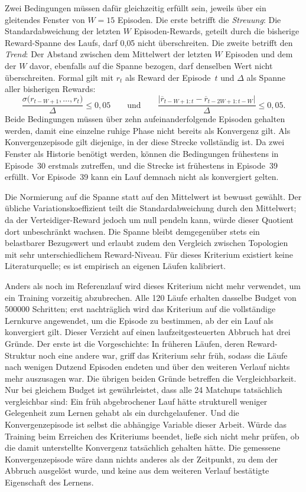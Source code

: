 Zwei Bedingungen müssen dafür gleichzeitig erfüllt sein, jeweils über ein
gleitendes Fenster von $W = 15$ Episoden. Die erste betrifft die
\emph{Streuung}: Die Standardabweichung der letzten $W$ Episoden-Rewards,
geteilt durch die bisherige Reward-Spanne des Laufs, darf 0{,}05 nicht
überschreiten. Die zweite betrifft den \emph{Trend}: Der Abstand zwischen dem
Mittelwert der letzten $W$ Episoden und dem der $W$ davor, ebenfalls auf die
Spanne bezogen, darf denselben Wert nicht überschreiten. Formal gilt mit
$r_{t}$ als Reward der Episode~$t$ und $\Delta$ als Spanne aller bisherigen
Rewards:
%
\begin{equation}
  \frac{\sigma\bigl(r_{t-W+1},\dots,r_{t}\bigr)}{\Delta} \le 0{,}05
  \qquad\text{und}\qquad
  \frac{\bigl|\overline{r}_{t-W+1:t} - \overline{r}_{t-2W+1:t-W}\bigr|}{\Delta}
  \le 0{,}05 .
  \label{eq:konvergenz}
\end{equation}
%
Beide Bedingungen müssen über zehn aufeinanderfolgende Episoden gehalten
werden, damit eine einzelne ruhige Phase nicht bereits als Konvergenz gilt.
Als Konvergenzepisode gilt diejenige, in der diese Strecke vollständig ist.
Da zwei Fenster als Historie benötigt werden, können die Bedingungen frühestens
in Episode~30 erstmals zutreffen, und die Strecke ist frühestens in Episode~39
erfüllt. Vor Episode~39 kann ein Lauf demnach nicht als konvergiert gelten.

Die Normierung auf die Spanne statt auf den Mittelwert ist bewusst gewählt. Der
übliche Variationskoeffizient teilt die Standardabweichung durch den
Mittelwert; da der Verteidiger-Reward jedoch um null pendeln kann, würde dieser
Quotient dort unbeschränkt wachsen. Die Spanne bleibt demgegenüber stets ein
belastbarer Bezugswert und erlaubt zudem den Vergleich zwischen Topologien mit
sehr unterschiedlichem Reward-Niveau. Für dieses Kriterium existiert keine
Literaturquelle; es ist empirisch an eigenen Läufen kalibriert.

Anders als noch im Referenzlauf wird dieses Kriterium nicht mehr
verwendet, um ein Training vorzeitig abzubrechen. Alle 120 Läufe erhalten
dasselbe Budget von \num{500000} Schritten; erst nachträglich wird das
Kriterium auf die vollständige Lernkurve angewendet, um die Episode zu
bestimmen, ab der ein Lauf als konvergiert gilt. Dieser Verzicht auf einen laufzeitgesteuerten
Abbruch hat drei Gründe. Der erste ist die Vorgeschichte: In früheren
Läufen, deren Reward-Struktur noch eine andere war, griff das Kriterium
sehr früh, sodass die Läufe nach wenigen Dutzend Episoden endeten und über
den weiteren Verlauf nichts mehr auszusagen war. Die übrigen beiden Gründe
betreffen die Vergleichbarkeit. Nur bei gleichem
Budget ist gewährleistet, dass alle 24 Matchups tatsächlich vergleichbar sind: Ein
früh abgebrochener Lauf hätte strukturell weniger Gelegenheit zum Lernen
gehabt als ein durchgelaufener. Und die Konvergenzepisode ist selbst die
abhängige Variable dieser Arbeit. Würde das Training beim Erreichen des
Kriteriums beendet, ließe sich nicht mehr prüfen, ob die damit unterstellte
Konvergenz tatsächlich gehalten hätte. Die gemessene Konvergenzepisode wäre
dann nichts anderes als der Zeitpunkt, zu dem der Abbruch ausgelöst wurde, und
keine aus dem weiteren Verlauf bestätigte Eigenschaft des Lernens.


